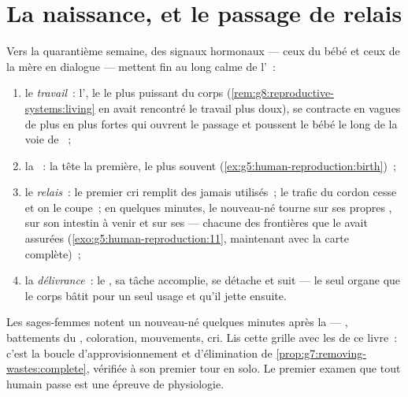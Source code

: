 \section{La naissance, et le passage de relais}

\begin{proposition}\label{prop:g8:from-egg-to-birth:birth}
Vers la quarantième semaine, des signaux hormonaux --- ceux du bébé
et ceux de la mère en dialogue --- mettent fin au long calme de
l'~:
\begin{enumerate}
  \item le \emph{travail}~: l', le  le plus puissant du
        corps (\cref{rem:g8:reproductive-systems:living} en avait
        rencontré le travail plus doux), se contracte en vagues de
        plus en plus fortes qui ouvrent le passage et poussent le
        bébé le long de la voie de ~;
  \item la \emph{}~: la tête la première, le plus souvent
        (\cref{ex:g5:human-reproduction:birth})~;
  \item le \emph{relais}~: le premier cri remplit des 
        jamais utilisés~; le trafic du cordon cesse et on le coupe~;
        en quelques minutes, le nouveau-né tourne sur ses propres
        , sur son intestin à venir et sur ses  ---
        chacune des frontières que le  avait assurées
        (\cref{exo:g5:human-reproduction:11}, maintenant avec la
        carte complète)~;
  \item la \emph{délivrance}~: le , sa tâche accomplie, se
        détache et suit --- le seul organe que le corps bâtit pour
        un seul usage et qu'il jette ensuite.
\end{enumerate}
\end{proposition}
\admitted

\begin{example}\label{ex:g8:from-egg-to-birth:audit}
Les sages-femmes notent un nouveau-né quelques minutes après la
 --- , battements du , coloration,
mouvements, cri. Lis cette grille avec les  de ce livre~: c'est
la boucle d'approvisionnement et d'élimination de
\cref{prop:g7:removing-wastes:complete}, vérifiée à son premier tour
en solo. Le premier examen que tout humain passe est une épreuve de
physiologie.
\end{example}

